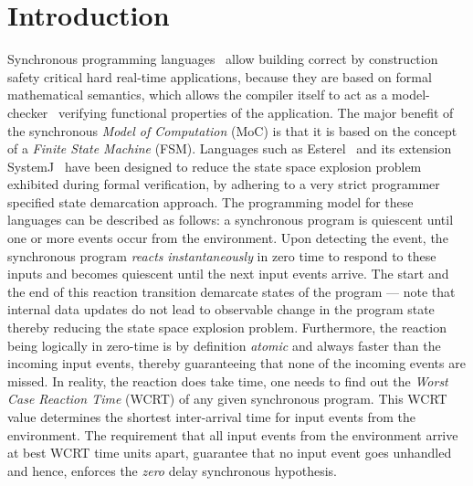 \section{Introduction}
\label{sec:introduction}

Synchronous programming languages~\cite{berry92} allow building correct
by construction safety critical hard real-time applications, because
they are based on formal mathematical semantics, which allows the
compiler itself to act as a model-checker~\cite{jagadeesan1995safety}
verifying functional properties of the application. The major benefit of
the synchronous \textit{Model of Computation} (MoC) is that it is based
on the concept of a \textit{Finite State Machine} (FSM). Languages such
as Esterel~\cite{berry92} and its extension SystemJ~\cite{amal10} have
been designed to reduce the state space explosion problem exhibited
during formal verification, by adhering to a very strict programmer
specified state demarcation approach. The programming model for these
languages can be described as follows: a synchronous program is
quiescent until one or more events occur from the environment. Upon
detecting the event, the synchronous program \textit{reacts}
\textit{instantaneously} in zero time to respond to these inputs and
becomes quiescent until the next input events arrive. The start and the
end of this reaction transition demarcate states of the program --- note
that internal data updates do not lead to observable change in the
program state thereby reducing the state space explosion problem.
Furthermore, the reaction being logically in zero-time is by definition
\textit{atomic} and always faster than the incoming input events,
thereby guaranteeing that none of the incoming events are missed. In
reality, the reaction does take time, one needs to find out the
\textit{Worst Case Reaction Time} (WCRT) of any given synchronous
program. This WCRT value determines the shortest inter-arrival time for
input events from the environment. {\color{black} The requirement that
  all input events from the environment arrive at best WCRT time units
  apart, guarantee that no input event goes unhandled and hence,
  enforces the \textit{zero} delay synchronous hypothesis.}

